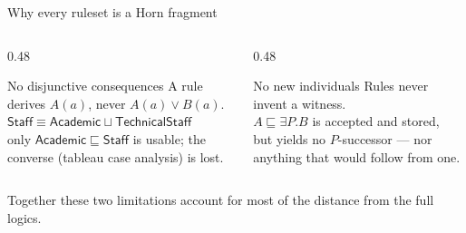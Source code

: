 \documentclass[10pt,aspectratio=169,xcolor=table]{beamer}
\newcommand{\cn}[1]{\mathsf{#1}}
\newcommand{\sub}{\sqsubseteq}
\newcommand{\eqv}{\equiv}
\begin{document}
\begin{frame}{Why every ruleset is a Horn fragment}
  \begin{columns}[T]
    \begin{column}{0.48\textwidth}
      \begin{block}{No disjunctive consequences}
        \small
        A rule derives $A(a)$, never $A(a) \lor B(a)$.\\[4pt]
        $\cn{Staff} \eqv \cn{Academic} \sqcup \cn{TechnicalStaff}$\\[2pt]
        only $\cn{Academic} \sub \cn{Staff}$ is usable; the converse
        (tableau case analysis) is lost.
      \end{block}
    \end{column}
    \begin{column}{0.48\textwidth}
      \begin{block}{No new individuals}
        \small
        Rules never invent a witness.\\[4pt]
        $A \sub \exists P.B$ is accepted and stored,\\[2pt]
        but yields no $P$-successor --- nor anything that would follow from one.
      \end{block}
    \end{column}
  \end{columns}
  \vspace{1em}
  \small
  Together these two limitations account for most of the distance from the full logics.
\end{frame}
\end{document}
